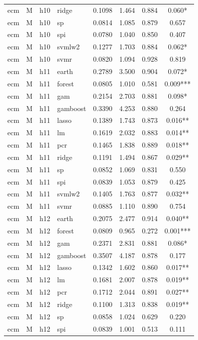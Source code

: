 \begin{ThreePartTable}
\begin{longtable}[t]{llclcccc}
ecm & M & h10 & ridge & 0.1098 & 1.464 & 0.884 & 0.060*\\
ecm & M & h10 & sp & 0.0814 & 1.085 & 0.879 & 0.657\\
ecm & M & h10 & spi & 0.0780 & 1.040 & 0.850 & 0.407\\
ecm & M & h10 & svmlw2 & 0.1277 & 1.703 & 0.884 & 0.062*\\
ecm & M & h10 & svmr & 0.0820 & 1.094 & 0.928 & 0.819\\
\addlinespace
ecm & M & h11 & earth & 0.2789 & 3.500 & 0.904 & 0.072*\\
ecm & M & h11 & forest & 0.0805 & 1.010 & 0.581 & 0.009***\\
ecm & M & h11 & gam & 0.2154 & 2.703 & 0.881 & 0.098*\\
ecm & M & h11 & gamboost & 0.3390 & 4.253 & 0.880 & 0.264\\
ecm & M & h11 & lasso & 0.1389 & 1.743 & 0.873 & 0.016**\\
ecm & M & h11 & lm & 0.1619 & 2.032 & 0.883 & 0.014**\\
ecm & M & h11 & pcr & 0.1465 & 1.838 & 0.889 & 0.018**\\
ecm & M & h11 & ridge & 0.1191 & 1.494 & 0.867 & 0.029**\\
ecm & M & h11 & sp & 0.0852 & 1.069 & 0.831 & 0.550\\
ecm & M & h11 & spi & 0.0839 & 1.053 & 0.879 & 0.425\\
ecm & M & h11 & svmlw2 & 0.1405 & 1.763 & 0.877 & 0.032**\\
ecm & M & h11 & svmr & 0.0885 & 1.110 & 0.890 & 0.754\\
\addlinespace
ecm & M & h12 & earth & 0.2075 & 2.477 & 0.914 & 0.040**\\
ecm & M & h12 & forest & 0.0809 & 0.965 & 0.272 & 0.001***\\
ecm & M & h12 & gam & 0.2371 & 2.831 & 0.881 & 0.086*\\
ecm & M & h12 & gamboost & 0.3507 & 4.187 & 0.878 & 0.177\\
ecm & M & h12 & lasso & 0.1342 & 1.602 & 0.860 & 0.017**\\
ecm & M & h12 & lm & 0.1681 & 2.007 & 0.878 & 0.019**\\
ecm & M & h12 & pcr & 0.1712 & 2.044 & 0.891 & 0.027**\\
ecm & M & h12 & ridge & 0.1100 & 1.313 & 0.838 & 0.019**\\
ecm & M & h12 & sp & 0.0858 & 1.024 & 0.629 & 0.220\\
ecm & M & h12 & spi & 0.0839 & 1.001 & 0.513 & 0.111\\

\end{longtable}
\end{ThreePartTable}
